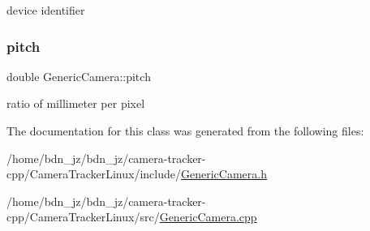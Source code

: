 device identifier 

\mbox{\label{class_generic_camera_a565f94ee10ad6333ca6e59a2fe8d32bb}} 
\subsubsection{\texorpdfstring{pitch}{pitch}}
{\footnotesize\ttfamily double Generic\+Camera\+::pitch\hspace{0.3cm}{\ttfamily [protected]}}



ratio of millimeter per pixel 



The documentation for this class was generated from the following files\+:\begin{DoxyCompactItemize}
\item 
/home/bdn\+\_\+jz/bdn\+\_\+jz/camera-\/tracker-\/cpp/\+Camera\+Tracker\+Linux/include/\hyperlink{_generic_camera_8h}{Generic\+Camera.\+h}\item 
/home/bdn\+\_\+jz/bdn\+\_\+jz/camera-\/tracker-\/cpp/\+Camera\+Tracker\+Linux/src/\hyperlink{_generic_camera_8cpp}{Generic\+Camera.\+cpp}\end{DoxyCompactItemize}

